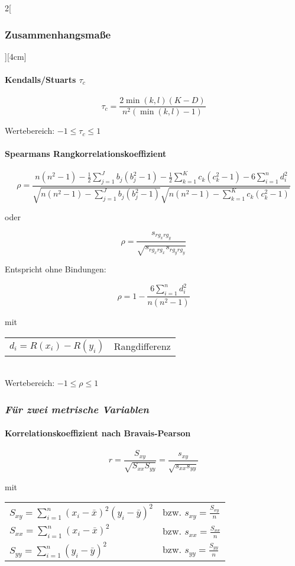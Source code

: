 \documentclass[8pt]{extarticle}
\begin{document}
\begin{multicols}{2}[\subsubsection{Zusammenhangsmaße}][4cm]
\paragraph{Kendalls/Stuarts $\tau_c$}

$$\tau_c=\frac{2\min(k,l)(K-D)}{n^2(\min(k,l)-1)}$$

Wertebereich: $-1 \le \tau_c \le 1$

\paragraph{Spearmans Rangkorrelationskoeffizient}

$$\rho=\frac{n(n^2-1)-\frac{1}{2}\sum\limits_{j=1}^J b_j(b_j^2-1)-\frac{1}{2}\sum\limits_{k=1}^K c_k(c_k^2-1)-6\sum\limits_{i=1}^n d_i^2}{\sqrt{n(n^2-1)-\sum\limits_{j=1}^J b_j(b_j^2-1)}\sqrt{n(n^2-1)-\sum\limits_{k=1}^Kc_k(c_k^2-1)}}$$

oder

$$\rho=\frac{s_{rg_xrg_y}}{\sqrt{s_{rg_xrg_x}s_{rg_yrg_y}}}$$

 Entspricht ohne Bindungen:

$$\rho=1-\frac{6\sum\limits_{i=1}^nd_i^2}{n(n^2-1)}$$

mit

\begin{tabular}{l l } 
 $d_i=R(x_i)-R(y_i)$ & Rangdifferenz \\ 
\end{tabular}

\ \\

Wertebereich: $-1 \le \rho \le 1$

\subsubsection*{\textit{Für zwei metrische Variablen}}

\paragraph{Korrelationskoeffizient nach Bravais-Pearson}

$$r=\frac{S_{xy}}{\sqrt{S_{xx}S_{yy}}}=\frac{s_{xy}}{\sqrt{s_{xx}s_{yy}}}$$

mit

\begin{tabular}{l l } 
$S_{xy}=\sum\limits_{i=1}^n(x_i-\bar{x})^2(y_i-\bar{y})^2$ & bzw. $s_{xy}=\frac{S_{xy}}{n}$ \\
$S_{xx}=\sum\limits_{i=1}^n(x_i-\bar{x})^2$ & bzw. $s_{xx}=\frac{S_{xx}}{n}$ \\ 
$S_{yy}=\sum\limits_{i=1}^n(y_i-\bar{y})^2$ & bzw. $s_{yy}=\frac{S_{yy}}{n}$ \\
\end{tabular}


\end{multicols}
\end{document}
